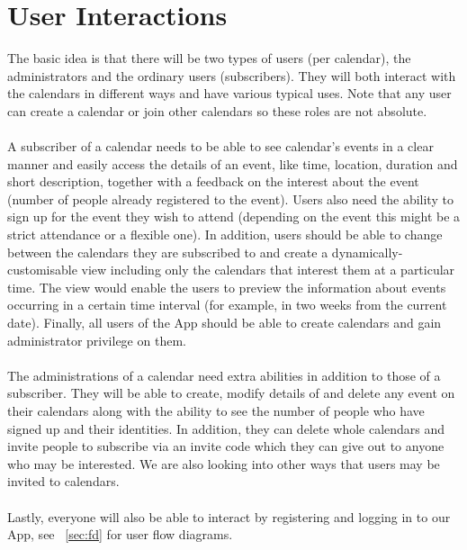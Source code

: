 \documentclass[10pt,a4paper]{article}
\begin{document}
\section{User Interactions} 
The basic idea is that there will be two types of users (per calendar), the administrators and the ordinary users (subscribers). They will both interact with the calendars in different ways and have various typical uses. Note that any user can create a calendar or join other calendars so these roles are not absolute.
\\
\\
\noindent
A subscriber of a calendar needs to be able to see calendar's events in a clear manner and easily access the details of an event, like time, location, duration and short description, together with a feedback on the interest about the event (number of people already registered to the event). Users also need the ability to sign up for the event they wish to attend (depending on the event this might be a strict attendance or a flexible one). In addition, users should be able to change between the calendars they are subscribed to and create a dynamically-customisable view including only the calendars that interest them at a particular time. The view would enable the users to preview the information about events occurring in a certain time interval (for example, in two weeks from the current date). Finally, all users of the App should be able to create calendars and gain administrator privilege on them. 
\\
\\
\noindent
The administrations of a calendar need extra abilities in addition to those of a subscriber. They will be able to create, modify details of and delete any event on their calendars along with the ability to see the number of people who have signed up and their identities. In addition, they can delete whole calendars and invite people to subscribe via an invite code which they can give out to anyone who may be interested. We are also looking into other ways that users may be invited to calendars.  
\\
\\
\noindent
Lastly, everyone will also be able to interact by registering and logging in to our App, see ~\cref{sec:fd} for user flow diagrams.

\appendix
\label{appendix}
\end{document}
